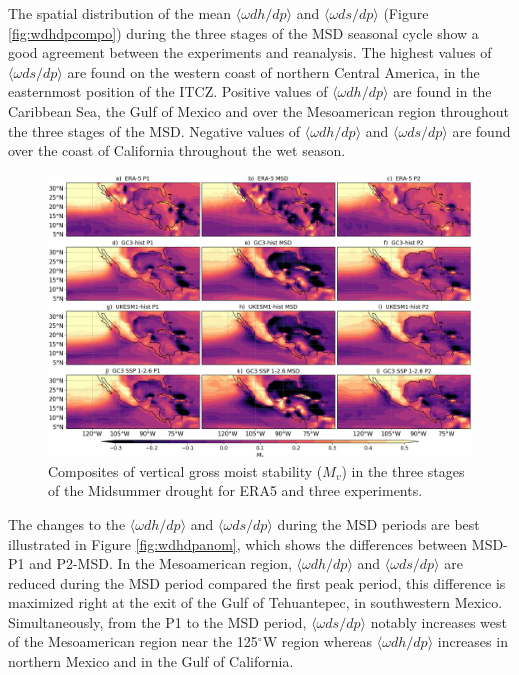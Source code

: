 The spatial distribution of the mean $\langle \omega dh/dp \rangle$ and $\langle \omega ds/dp \rangle$ (Figure \ref{fig:wdhdpcompo}) during the three stages of the MSD seasonal cycle show a good agreement between the experiments and reanalysis. The highest values of $\langle \omega ds/dp \rangle$ are found on the western coast of northern Central America, in the easternmost position of the ITCZ. Positive values of $\langle \omega dh/dp \rangle$  are found in the Caribbean Sea, the Gulf of Mexico and over the Mesoamerican region throughout the three stages of the MSD. Negative values of $\langle \omega dh/dp \rangle$ and $\langle \omega ds/dp \rangle$ are found over the coast of California throughout the wet season. 

\begin{figure}[t!]
\includegraphics[width=\linewidth]{figures/thermocompositeMvclim.png}
\caption[Composites of gross moist stability]{Composites of vertical gross moist stability ($M_v$) in the three stages of the Midsummer drought for ERA5 and three experiments.  }
\label{fig:Mvcompo}
\end{figure} 
 
 The changes to the $\langle \omega dh/dp \rangle$ and $\langle \omega ds/dp \rangle$ during the MSD periods are best illustrated in Figure \ref{fig:wdhdpanom}, which shows the differences between MSD-P1 and P2-MSD. In the Mesoamerican region, $\langle \omega dh/dp \rangle$ and $\langle \omega ds/dp \rangle$ are reduced during the MSD period compared the first peak period, this difference is maximized right at the exit of the Gulf of Tehuantepec, in southwestern Mexico. 
 Simultaneously, from the P1 to the MSD period, $\langle \omega ds/dp \rangle$ notably increases west of the Mesoamerican region near the 125$^\circ$W region whereas $\langle \omega dh/dp \rangle$ increases in northern Mexico and in the Gulf of California. 
 
